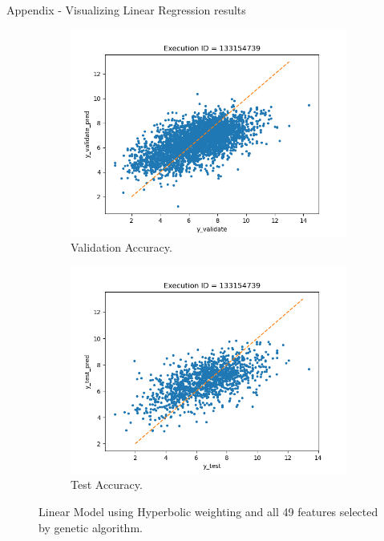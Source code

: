 \documentclass{beamer}
\begin{document}
\begin{frame}[t]{Appendix - Visualizing Linear Regression results}
\begin{figure}
     \centering
     \begin{subfigure}[b]{0.45\textwidth}
         \centering
         \includegraphics[scale=0.35]{images/accuracyValidateLGHyperbolic}
         \caption{Validation Accuracy.}
        \label{fig:accuracyValidateLGHyperbolic}
     \end{subfigure}
     \hfill
     \begin{subfigure}[b]{0.45\textwidth}
         \centering
         \includegraphics[scale=0.35]{images/accuracytestLGHyperbolic}
        \caption{Test Accuracy.}
        \label{fig:accuracytestLGHyperbolic}
     \end{subfigure}
     \caption{Linear Model using Hyperbolic weighting and all 49 features selected by genetic algorithm.}
     \label{fig:BestLinearModel}
\end{figure}
\end{frame}
\end{document}

